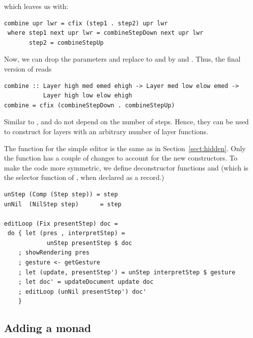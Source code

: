 \documentclass{llncs}
\begin{document}
which leaves us with:

\begin{small}%
\begin{verbatim}
combine upr lwr = cfix (step1 . step2) upr lwr
 where step1 next upr lwr = combineStepDown next upr lwr
       step2 = combineStepUp
\end{verbatim}
\end{small}


Now, we can drop the parameters and replace to  and  by  and . Thus, the final version of  reads

\begin{small}%
\begin{verbatim}
combine :: Layer high med emed ehigh -> Layer med low elow emed -> 
           Layer high low elow ehigh
combine = cfix (combineStepDown . combineStepUp)
\end{verbatim}
\end{small}


Similar to ,  and  do not depend on the number of steps. Hence, they can be used to construct  for layers with an arbitrary number of layer functions.



The  function for the simple editor is the same as in Section~\ref{sect:hidden}. Only the  function has a couple of changes to account for the new constructors. To make the code more symmetric, we define deconstructor functions  and  (which is the selector function of , when declared as a record.)

\begin{small}
\begin{verbatim}
unStep (Comp (Step step)) = step
unNil  (NilStep step)      = step

editLoop (Fix presentStep) doc = 
 do { let (pres , interpretStep) = 
            unStep presentStep $ doc   
    ; showRendering pres
    ; gesture <- getGesture    
    ; let (update, presentStep') = unStep interpretStep $ gesture    
    ; let doc' = updateDocument update doc
    ; editLoop (unNil presentStep') doc'
    }
\end{verbatim}%
\end{small}
\subsection{Adding a monad}
\end{document}
